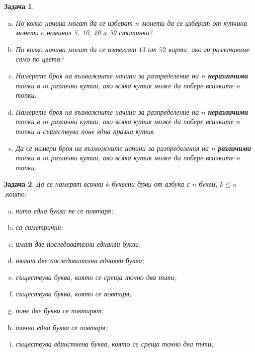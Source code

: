 \documentclass[a4paper]{article}
\newtheorem{problem}{Задача}
\begin{document}
\begin{problem}
  \begin{enumerate}[a)]
  \item
    По колко начина могат да се изберат $n$ монети да се изберат от купчина монети с номинал 5, 10, 20 и 50 стотинки?
  \item
    По колко начина могат да се изтеглят $13$ от $52$ карти, ако ги различаваме само по цвета?
  \item
    Намерете броя на възможните начини за разпределение на $n$ {\bf неразличими} топки в $m$ различни кутии, ако всяка кутия може да побере
    всичките $n$ топки.
  \item
    Намерете броя на възможните начини за разпределение на $n$ {\bf неразличими} топки в $m$ различни кутии, ако всяка кутия може да побере
    всичките $n$ топки и съществува поне една празна кутия.
  \item
    Да се намери броя на възможните начини за разпределения на $n$ {\bf различими} топки в $m$ различни кутии, ако всяка кутия може да побере всичките $n$ топки.
  \end{enumerate}
\end{problem}



\begin{problem}
  Да се намерят всички $k$-буквени думи от азбука с $n$ букви, $k\leq n$,които:
  \begin{enumerate}[a)]
  \item
    нито една буква не се повтаря;
  \item
    са симетрични;
  \item
    имат две последователни еднакви букви;
  \item
    нямат две последователни еднакви букви;
  \item
    съществува буква, която се среща точно два пъти;
  \item
    съществува буква, която се повтаря;
  \item
    поне две букви се повтарят;
  \item
    точно една буква се повтаря;
  \item
    съществува единствена буква, която се среща точно два пъти;
\end{enumerate}
\end{problem}
\end{document}

